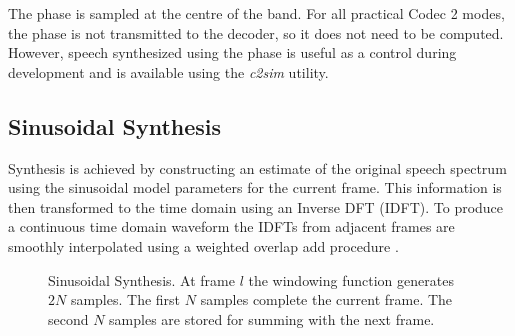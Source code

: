 \documentclass{article}
\begin{document}
{The phase is sampled at the centre of the band.  For all practical Codec 2 modes, the phase is not transmitted to the decoder, so it does not need to be computed.  However, speech synthesized using the phase is useful as a control during development and is available using the \emph{c2sim} utility.

\subsection{Sinusoidal Synthesis}

Synthesis is achieved by constructing an estimate of the original speech spectrum using the sinusoidal model parameters for the current frame. This information is then transformed to the time domain using an Inverse DFT (IDFT). To produce a continuous time domain waveform the IDFTs from adjacent frames are smoothly interpolated using a weighted overlap add procedure \cite{mcaulay1986speech}.

\begin{figure}[h]
\caption{Sinusoidal Synthesis.  At frame $l$ the windowing function generates $2N$ samples.  The first $N$ samples complete the current frame. The second $N$ samples are stored for summing with the next frame.}
\label{fig:synthesis}
\begin{center}
\end{center}
\end{figure}}
\end{document}
